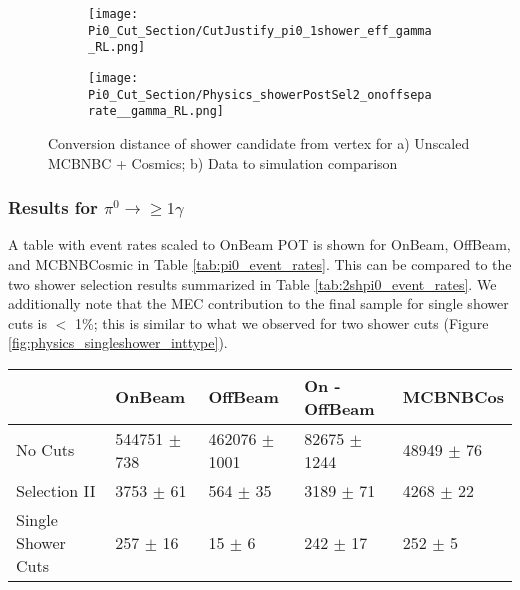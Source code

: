\begin{figure}[h!]
\centering
  \begin{subfigure}[t]{0.35\textwidth}
    \centering
\texttt{[image: Pi0\_Cut\_Section/CutJustify\_pi0\_1shower\_eff\_gamma\_RL.png]}
  \caption{ }
  \end{subfigure} 
  \hspace{30mm}
  \begin{subfigure}[t]{0.35\textwidth}
    \centering
\texttt{[image: Pi0\_Cut\_Section/Physics\_showerPostSel2\_onoffseparate\_\_gamma\_RL.png]}
  \caption{ }
  \end{subfigure} 
\caption{ Conversion distance of shower candidate from vertex for a) Unscaled MCBNBC + Cosmics; b) Data to simulation comparison }
\label{fig:cutjust_pi0_1shower_RL}
\end{figure}

\subsubsection{Results for $\pi^0\rightarrow \geq 1\gamma$}
\par A table with event rates scaled to OnBeam POT is shown for OnBeam, OffBeam, and MCBNBCosmic in Table \ref{tab:pi0_event_rates}. This can be compared to the two shower selection results summarized in Table \ref{tab:2shpi0_event_rates}.  We additionally note that the MEC contribution to the final sample for single shower cuts is $<$ 1\%; this is similar to what we observed for two shower cuts (Figure \ref{fig:physics_singleshower_inttype}). %

\begin{table}[H] 
 \centering
 \begin{tabular}{| l | l | l | l | l |}
  \hline
   & OnBeam & OffBeam & On - OffBeam & MCBNBCos \\ [0.1ex] \hline
No Cuts & 544751 $\pm$ 738 & 462076 $\pm$ 1001 & 82675 $\pm$ 1244 & 48949 $\pm$ 76 \\ 
Selection II & 3753 $\pm$ 61 & 564 $\pm$ 35  & 3189 $\pm$ 71 & 4268 $\pm$ 22  \\ 
Single Shower Cuts & 257 $\pm$ 16 & 15 $\pm$ 6 & 242 $\pm$ 17 & 252 $\pm$ 5  \\ \hline
\end{tabular}
 \end{table}


